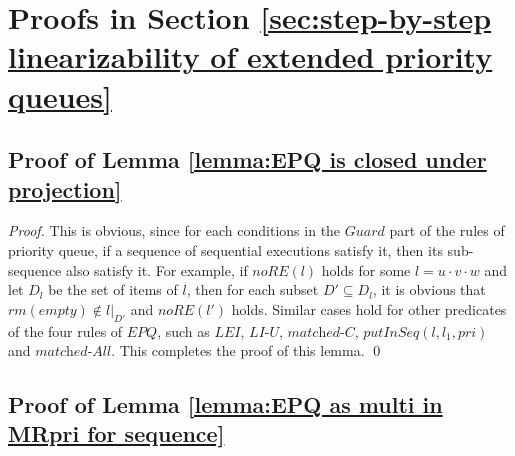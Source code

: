 \section{Proofs in Section \ref{sec:step-by-step linearizability of extended priority queues}}
\label{sec:appendix in section step-by-step linearizability of extended priority queues}


\subsection{Proof of Lemma \ref{lemma:EPQ is closed under projection}}

\EPQisClosedUnderProjection*

\begin {proof}

This is obvious, since for each conditions in the $\textit{Guard}$ part of the rules of priority queue, if a sequence of sequential executions satisfy it, then its sub-sequence also satisfy it. For example, if $\textit{noRE}(l)$ holds for some $l = u \cdot v \cdot w$ and let $D_l$ be the set of items of $l$, then for each subset $D' \subseteq D_l$, it is obvious that $\textit{rm}(\textit{empty}) \notin l \vert_{ D' }$ and $\textit{noRE}(l')$ holds. Similar cases hold for other predicates of the four rules of $\textit{EPQ}$, such as $\textit{LEI}$, $\textit{LI-U}$, $\textit{matched-C}$, $\textit{putInSeq}(l,l_1,\textit{pri})$ and $\textit{matched-All}$. This completes the proof of this lemma. \qed
\end {proof}


\subsection{Proof of Lemma \ref{lemma:EPQ as multi in MRpri for sequence}}

\EPQasMultiInMRpriforSequence*

